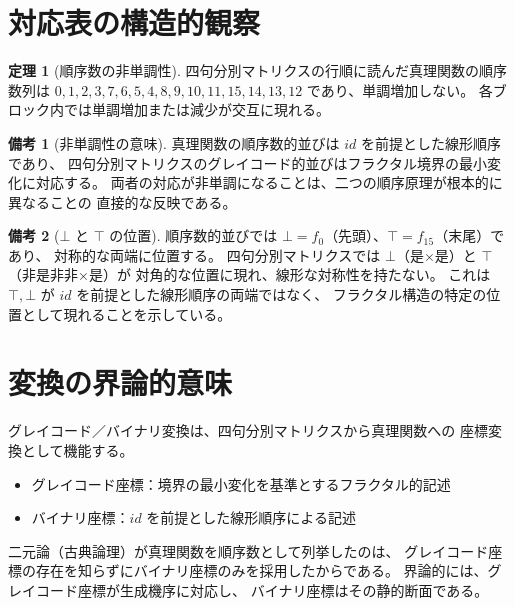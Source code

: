 \documentclass[11pt,a4paper]{article}
\theoremstyle{definition}
\newtheorem{theorem}{定理}[section]
\newtheorem{remark}{備考}[section]
\begin{document}
\section{対応表の構造的観察}

\begin{theorem}[順序数の非単調性]
四句分別マトリクスの行順に読んだ真理関数の順序数列は
$0,1,2,3,7,6,5,4,8,9,10,11,15,14,13,12$
であり、単調増加しない。
各ブロック内では単調増加または減少が交互に現れる。
\end{theorem}

\begin{remark}[非単調性の意味]
真理関数の順序数的並びは $id$ を前提とした線形順序であり、
四句分別マトリクスのグレイコード的並びはフラクタル境界の最小変化に対応する。
両者の対応が非単調になることは、二つの順序原理が根本的に異なることの
直接的な反映である。
\end{remark}

\begin{remark}[$\bot$ と $\top$ の位置]
順序数的並びでは $\bot = f_0$（先頭）、$\top = f_{15}$（末尾）であり、
対称的な両端に位置する。
四句分別マトリクスでは $\bot$（是×是）と $\top$（非是非非×是）が
対角的な位置に現れ、線形な対称性を持たない。
これは $\top, \bot$ が $id$ を前提とした線形順序の両端ではなく、
フラクタル構造の特定の位置として現れることを示している。
\end{remark}

\section{変換の界論的意味}

グレイコード／バイナリ変換は、四句分別マトリクスから真理関数への
座標変換として機能する。

\begin{itemize}
  \item グレイコード座標：境界の最小変化を基準とするフラクタル的記述
  \item バイナリ座標：$id$ を前提とした線形順序による記述
\end{itemize}

二元論（古典論理）が真理関数を順序数として列挙したのは、
グレイコード座標の存在を知らずにバイナリ座標のみを採用したからである。
界論的には、グレイコード座標が生成機序に対応し、
バイナリ座標はその静的断面である。
\end{document}
